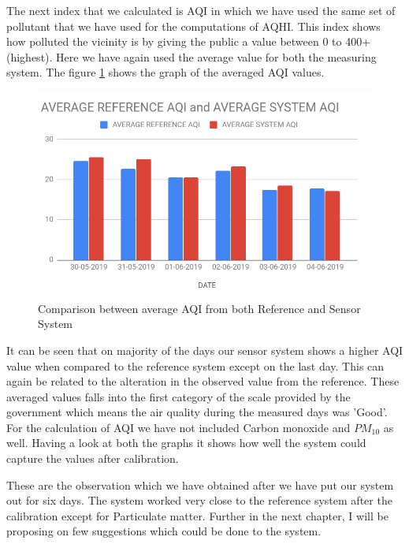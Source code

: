  The next index that we calculated is AQI in which we have used the same set of pollutant that we have used for the computations of AQHI. This index shows how polluted the vicinity is by giving the public a value between 0 to 400+ (highest). Here we have again used the average value for both the measuring system. The figure \ref{AQIAV} shows the graph of the averaged AQI values.

 \begin{figure}[h]
  \begin{center}
  \includegraphics[scale=0.70]{images/figure35.png}
  \end{center}
  \caption{Comparison between average AQI from both Reference and Sensor System}
  \label{AQIAV}
\end{figure}

It can be seen that on majority of the days our sensor system shows a higher AQI value when compared to the reference system except on the last day. This can again be related to the alteration in the observed value from the reference. These averaged values falls into the first category of the scale provided by the government which means the air quality during the measured days was 'Good'. For the calculation of AQI we have not included Carbon monoxide and $PM_{10}$ as well. 
Having a look at both the graphs it shows how well the system could capture the values after calibration. 

These are the observation which we have obtained after we have put our system out for six days. The system worked very close to the reference system after the calibration except for Particulate matter. Further in the next chapter, I will be proposing on few suggestions which could be done to the system.